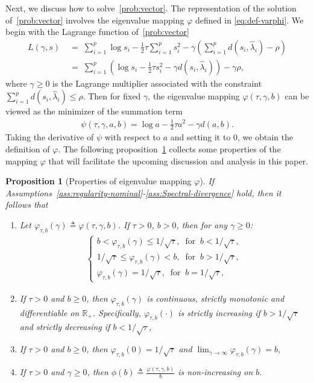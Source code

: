 \documentclass[11pt]{article}
\def\R{\mathbb{R}}
\newtheorem{proposition}{Proposition}
\newcommand{\Let}{\triangleq}
\def\R{\mathbb{R}}
\newcommand{\wh}{\widehat}
\begin{document}
Next, we discuss how to solve~\eqref{prob:vector}. The  representation of the solution of~\eqref{prob:vector} 
involves  the eigenvalue mapping $\varphi$ defined in \eqref{eq:def-varphi}.
We begin with the Lagrange function of~\eqref{prob:vector}
\begin{align*}
    L(\gamma, s) &\;=\; \sum_{i=1}^p \log s_i - \frac{1}{2}\tau\sum_{i=1}^p s_i^2 -\gamma \left(\sum_{i=1}^p d(s_i,\widehat{\lambda}_i)- \rho\right)\\
    &\;=\; \sum_{i=1}^p \left(\log s_i - \frac{1}{2}\tau s_i^2 -\gamma d(s_i,\wh{\lambda}_i)\right) - \gamma \rho,
\end{align*}
where $\gamma \geq 0$ is the Lagrange multiplier associated with the constraint $\sum_{i=1}^p d(s_i, \widehat{\lambda}_i)\leq  \rho$. Then for fixed $\gamma$, the eigenvalue mapping $\varphi(\tau, \gamma, b)$ can be viewed as the minimizer of the summation term
\begin{align*}
    \psi(\tau,\gamma,a,b) = \log a - \frac{1}{2}\tau a^2 - \gamma d(a,b).
\end{align*}
Taking the derivative of $\psi$ with respect to $a$ and setting it to $0$, we obtain the definition of $\varphi$. The following proposition~\ref{prop:pro-of-varphi} collects some properties of the mapping $\varphi$ that will facilitate the upcoming discussion and analysis in this paper.

\begin{proposition}[Properties of eigenvalue mapping $\varphi$]\label{prop:pro-of-varphi}
If Assumptions~\ref{ass:regularity-nominal}-\ref{ass:Spectral-divergence} hold, then it follows that
\begin{enumerate}[label = (\roman*)]
    \item Let $\varphi_{\tau, b}(\gamma) \Let \varphi(\tau, \gamma, b)$. If $\tau>0$, $b>0$, then for any $\gamma \geq 0$:
    \begin{align*}
        \left\{\begin{matrix}
            b< \varphi_{\tau, b}(\gamma)\leq 1/\sqrt{\tau},\;\;\text{for}\;\;b< 1/\sqrt{\tau},\\
            1/\sqrt{\tau}\leq \varphi_{\tau, b}(\gamma)< b,\;\;\text{for}\;\;b> 1/\sqrt{\tau},\\
            \varphi_{\tau, b}(\gamma) = 1/\sqrt{\tau},\;\;\text{for}\;\;b= 1/\sqrt{\tau},
        \end{matrix}\right.
    \end{align*}
    
    \item If $\tau>0$ and $b\geq0$, then $\varphi_{\tau, b}(\gamma)$ is continuous, strictly monotonic and differentiable on $\R_{+}$. Specifically, $\varphi_{\tau,b}(\cdot)$ is strictly increasing if $b>1/\sqrt{\tau}$ and strictly decreasing if $b<1/\sqrt{\tau}$,
    \item If $\tau>0$ and $b\geq0$, then $\varphi_{\tau,b}(0) = 1/\sqrt{\tau}$ and $\lim_{\gamma\to\infty} \varphi_{\tau,b}(\gamma) = b$,
    \item If $\tau>0$ and $\gamma\geq0$, then $\phi(b)\Let \frac{\varphi(\tau,\gamma,b)}{b}$ is non-increasing on $b$.
\end{enumerate}
\end{proposition}
\end{document}
